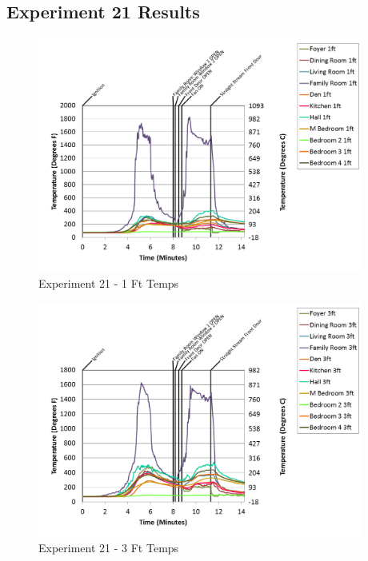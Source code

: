 \documentclass{article}
\begin{document}
\begin{appendices}
\clearpage

\clearpage
\clearpage		\large
\subsection{Experiment 21 Results} \label{App:Exp21Results} 

\begin{figure}[h!]
	\centering
	\includegraphics[height=3.05in]{0_Images/Results_Charts/Exp_21_Charts/1FtTemps.png}
	\caption{Experiment 21 - 1 Ft Temps}
\end{figure}


\begin{figure}[h!]
	\centering
	\includegraphics[height=3.05in]{0_Images/Results_Charts/Exp_21_Charts/3FtTemps.png}
	\caption{Experiment 21 - 3 Ft Temps}
\end{figure}

\clearpage


\end{appendices}
\end{document}
